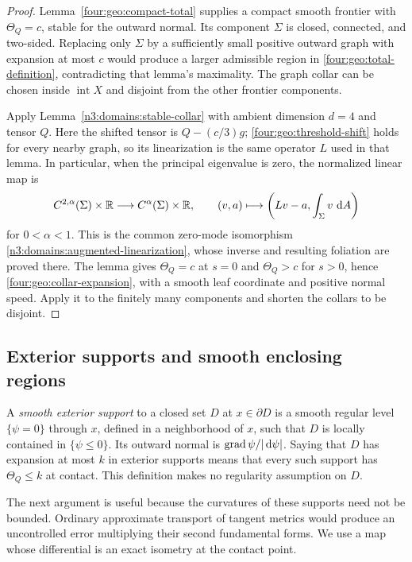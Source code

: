 \begin{proof}
Lemma~\ref{four:geo:compact-total} supplies a compact smooth frontier
with $\Theta_Q=c$, stable for the outward normal.  Its component $\Sigma$
is closed, connected, and two-sided.  Replacing only $\Sigma$ by a
sufficiently small positive outward graph with expansion at most $c$
would produce a larger admissible region in
\eqref{four:geo:total-definition}, contradicting that lemma's maximality.
The graph collar can be chosen inside $\operatorname{int}X$ and disjoint
from the other frontier components.

Apply Lemma~\ref{n3:domains:stable-collar} with ambient dimension $d=4$
and tensor $Q$.  Here the shifted tensor is $Q-(c/3)g$;
\eqref{four:geo:threshold-shift} holds for every nearby graph, so its
linearization is the same operator $L$ used in that lemma.  In particular,
when the principal eigenvalue is zero, the normalized linear map is
\begin{equation}\label{four:geo:augmented-stability}
 C^{2,\alpha}(\Sigma)\times\mathbb R\longrightarrow C^\alpha(\Sigma)\times\mathbb R,
 \qquad (v,a)\longmapsto
 \left(Lv-a,\int_\Sigma v\,\,\mathrm d A\right)
\end{equation}
for $0<\alpha<1$.  This is the common zero-mode isomorphism
\eqref{n3:domains:augmented-linearization}, whose inverse and resulting
foliation are proved there.  The lemma gives $\Theta_Q=c$ at $s=0$
and $\Theta_Q>c$ for $s>0$, hence \eqref{four:geo:collar-expansion},
with a smooth leaf coordinate and positive normal speed.  Apply it to
the finitely many components and shorten the collars to be disjoint.
\end{proof}

\subsection{Exterior supports and smooth enclosing regions}

A \emph{smooth exterior support} to a closed set $D$ at
$x\in\partial D$ is a smooth regular level $\{\psi=0\}$ through $x$,
defined in a neighborhood of $x$, such that $D$ is locally contained in
$\{\psi\le0\}$.  Its outward normal is $\operatorname{grad}\psi/|\,\mathrm d\psi|$.  Saying
that $D$ has expansion at most $k$ in exterior supports means that every
such support has $\Theta_Q\le k$ at contact.  This definition makes no
regularity assumption on $D$.

The next argument is useful because the curvatures of these supports need
not be bounded.  Ordinary approximate transport of tangent metrics would
produce an uncontrolled error multiplying their second fundamental forms.
We use a map whose differential is an exact isometry at the contact point.

